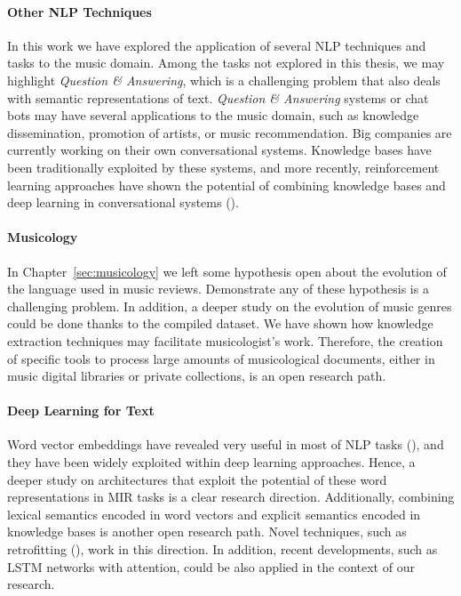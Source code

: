 \paragraph{Other NLP Techniques} In this work we have explored the application of several NLP techniques and tasks to the music domain. Among the tasks not explored in this thesis, we may highlight \textit{Question \& Answering}, which is a challenging problem that also deals with semantic representations of text. \textit{Question \& Answering} systems or chat bots may have several applications to the music domain, such as knowledge dissemination, promotion of artists, or music recommendation. Big companies are currently working on their own conversational systems. Knowledge bases have been traditionally exploited by these systems, and more recently, reinforcement learning approaches have shown the potential of combining knowledge bases and deep learning in conversational systems (\cite{andreas2016learning}).

\paragraph{Musicology}
In Chapter~\ref{sec:musicology} we left some hypothesis open about the evolution of the language used in music reviews. Demonstrate any of these hypothesis is a challenging problem. In addition, a deeper study on the evolution of music genres could be done thanks to the compiled dataset. We have shown how knowledge extraction techniques may facilitate musicologist's work. Therefore, the creation of specific tools to process large amounts of musicological documents, either in music digital libraries or private collections, is an open research path.

\paragraph{Deep Learning for Text} Word vector embeddings have revealed very useful in most of NLP tasks (\cite{Collobert2011}), and they have been widely exploited within deep learning approaches. Hence, a deeper study on architectures that exploit the potential of these word representations in MIR tasks is a clear research direction. Additionally, combining lexical semantics encoded in word vectors and explicit semantics encoded in knowledge bases is another open research path. Novel techniques, such as retrofitting (\cite{faruqui2014retrofitting}), work in this direction. In addition, recent developments, such as LSTM networks with attention, could be also applied in the context of our research.

